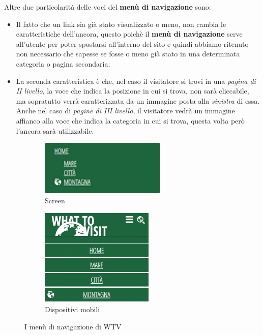 Altre due particolarità delle voci del \textbf{menù di navigazione} sono:
\begin{itemize}
\item Il fatto che un link sia già stato visualizzato o meno, non cambia le
caratteristiche dell'ancora, questo poichè il \textbf{menù di navigazione}
serve all'utente per poter spostarsi all'interno del sito e quindi abbiamo
ritenuto non necessario che sapesse se fosse o meno già stato in una
determinata categoria o pagina secondaria;
\item La seconda caratteristica è che, nel caso il visitatore si trovi in una
\textit{pagina di II livello}, la voce che indica la posizione in cui si
trova, non sarà cliccabile, ma sopratutto verrà caratterizzata da un immagine
posta alla \textit{sinistra} di essa. Anche nel caso di \textit{pagine di III
livello}, il visitatore vedrà un immagine affianco alla voce che indica la
categoria in cui si trova, questa volta però l'ancora sarà utilizzabile.
\end{itemize}
\begin{figure}[h!]
        \centering
        \begin{subfigure}[b]{0.3\textwidth}
                \includegraphics[height=2.63cm,width=6cm]{images/pres_nav.jpg}
                \caption{Screen}
                \label{fig:Nav-screen}
        \end{subfigure}
        \hspace{4cm}
        \begin{subfigure}[b]{0.3\textwidth}
                \includegraphics[height=4.65cm,width=5.4cm]{images/pres_nav_m.jpg}
                \caption{Dispositivi mobili}
                \label{fig:Nav-mobile}
        \end{subfigure}
        \caption{I menù di navigazione di WTV}\label{fig:Display-Nav}
\end{figure}

